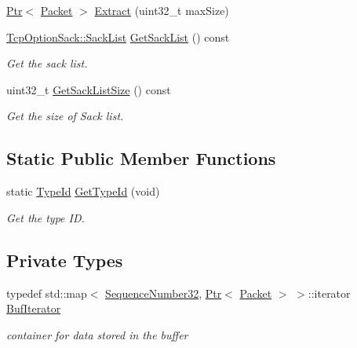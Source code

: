 \begin{DoxyCompactItemize}
\hyperlink{classns3_1_1Ptr}{Ptr}$<$ \hyperlink{classns3_1_1Packet}{Packet} $>$ \hyperlink{classns3_1_1TcpRxBuffer_a0a1254a5afa4cec6307a40af3ff46d30}{Extract} (uint32\+\_\+t max\+Size)
\item 
\hyperlink{classns3_1_1TcpOptionSack_a2aa2d721c71424680d79ebaa079f264a}{Tcp\+Option\+Sack\+::\+Sack\+List} \hyperlink{classns3_1_1TcpRxBuffer_afc5d672da4595330754de1bb3933a9c7}{Get\+Sack\+List} () const 
\begin{DoxyCompactList}\small\item\em Get the sack list. \end{DoxyCompactList}\item 
uint32\+\_\+t \hyperlink{classns3_1_1TcpRxBuffer_a45cf4c1e281f0e009cfdb3d0e0979436}{Get\+Sack\+List\+Size} () const 
\begin{DoxyCompactList}\small\item\em Get the size of Sack list. \end{DoxyCompactList}\end{DoxyCompactItemize}
\subsection*{Static Public Member Functions}
\begin{DoxyCompactItemize}
\item 
static \hyperlink{classns3_1_1TypeId}{Type\+Id} \hyperlink{classns3_1_1TcpRxBuffer_a8a130d844a17947fc541b4f94389306f}{Get\+Type\+Id} (void)
\begin{DoxyCompactList}\small\item\em Get the type ID. \end{DoxyCompactList}\end{DoxyCompactItemize}
\subsection*{Private Types}
\begin{DoxyCompactItemize}
\item 
typedef std\+::map$<$ \hyperlink{group__network_gacb2070e4e98d2d5135c9bede58f07a03}{Sequence\+Number32}, \hyperlink{classns3_1_1Ptr}{Ptr}$<$ \hyperlink{classns3_1_1Packet}{Packet} $>$ $>$\+::iterator \hyperlink{classns3_1_1TcpRxBuffer_a6d8a168521cf993cc3dec893067dcb62}{Buf\+Iterator}
\begin{DoxyCompactList}\small\item\em container for data stored in the buffer \end{DoxyCompactList}\end{DoxyCompactItemize}

